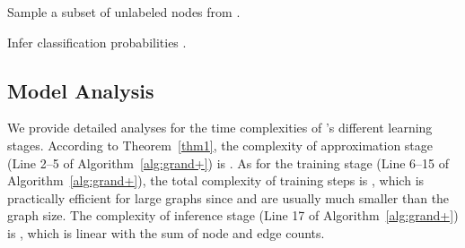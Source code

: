\begin{algorithm}[t!]

	\caption{\model}
	\footnotesize
	\label{alg:grand+}
	 Sample a subset of unlabeled nodes  from .\\



	  



		Infer classification probabilities .
		
\Return{}
\end{algorithm}
\subsection{Model Analysis} 
\label{sec:model_analysis}

  We provide detailed analyses for the time complexities of \model's different learning stages.
 According to Theorem~\ref{thm1}, the complexity of approximation stage (Line 2--5 of Algorithm~\ref{alg:grand+}) is . As for the training stage (Line 6--15 of Algorithm~\ref{alg:grand+}), the total complexity of  training steps is , which is  practically efficient for large graphs since  and  are usually much smaller than the graph size.
  The complexity of inference stage (Line 17 of Algorithm~\ref{alg:grand+}) is , which is linear with the sum of node and edge counts.
 
